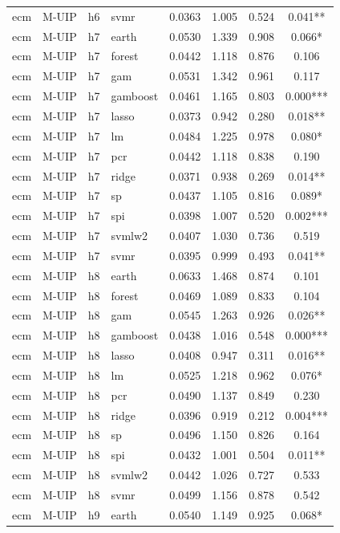 \begin{ThreePartTable}
\begin{longtable}[t]{llclcccc}
ecm & M-UIP & h6 & svmr & 0.0363 & 1.005 & 0.524 & 0.041**\\
\addlinespace
ecm & M-UIP & h7 & earth & 0.0530 & 1.339 & 0.908 & 0.066*\\
ecm & M-UIP & h7 & forest & 0.0442 & 1.118 & 0.876 & 0.106\\
ecm & M-UIP & h7 & gam & 0.0531 & 1.342 & 0.961 & 0.117\\
ecm & M-UIP & h7 & gamboost & 0.0461 & 1.165 & 0.803 & 0.000***\\
ecm & M-UIP & h7 & lasso & 0.0373 & 0.942 & 0.280 & 0.018**\\
ecm & M-UIP & h7 & lm & 0.0484 & 1.225 & 0.978 & 0.080*\\
ecm & M-UIP & h7 & pcr & 0.0442 & 1.118 & 0.838 & 0.190\\
ecm & M-UIP & h7 & ridge & 0.0371 & 0.938 & 0.269 & 0.014**\\
ecm & M-UIP & h7 & sp & 0.0437 & 1.105 & 0.816 & 0.089*\\
ecm & M-UIP & h7 & spi & 0.0398 & 1.007 & 0.520 & 0.002***\\
ecm & M-UIP & h7 & svmlw2 & 0.0407 & 1.030 & 0.736 & 0.519\\
ecm & M-UIP & h7 & svmr & 0.0395 & 0.999 & 0.493 & 0.041**\\
\addlinespace
ecm & M-UIP & h8 & earth & 0.0633 & 1.468 & 0.874 & 0.101\\
ecm & M-UIP & h8 & forest & 0.0469 & 1.089 & 0.833 & 0.104\\
ecm & M-UIP & h8 & gam & 0.0545 & 1.263 & 0.926 & 0.026**\\
ecm & M-UIP & h8 & gamboost & 0.0438 & 1.016 & 0.548 & 0.000***\\
ecm & M-UIP & h8 & lasso & 0.0408 & 0.947 & 0.311 & 0.016**\\
ecm & M-UIP & h8 & lm & 0.0525 & 1.218 & 0.962 & 0.076*\\
ecm & M-UIP & h8 & pcr & 0.0490 & 1.137 & 0.849 & 0.230\\
ecm & M-UIP & h8 & ridge & 0.0396 & 0.919 & 0.212 & 0.004***\\
ecm & M-UIP & h8 & sp & 0.0496 & 1.150 & 0.826 & 0.164\\
ecm & M-UIP & h8 & spi & 0.0432 & 1.001 & 0.504 & 0.011**\\
ecm & M-UIP & h8 & svmlw2 & 0.0442 & 1.026 & 0.727 & 0.533\\
ecm & M-UIP & h8 & svmr & 0.0499 & 1.156 & 0.878 & 0.542\\
\addlinespace
ecm & M-UIP & h9 & earth & 0.0540 & 1.149 & 0.925 & 0.068*\\

\end{longtable}
\end{ThreePartTable}
